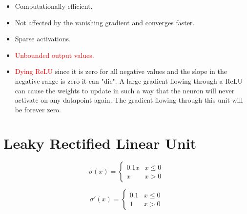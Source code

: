 \documentclass{article}
\begin{document}
\begin{itemize}
  \item Computationally efficient.
  \item Not affected by the vanishing gradient and converges faster.
  \item Sparse activations.
  \item \textcolor{red}{Unbounded output values.}
  \item \textcolor{red}{Dying ReLU}  since it is zero for all negative values and the slope in the negative range is zero it can "die". A large gradient flowing through a ReLU can cause the weights to update in such a way that the neuron will never activate on any datapoint again. The gradient flowing through this unit will be forever zero.
\end{itemize}

\clearpage

\section{Leaky Rectified Linear Unit}

\begin{figure}[!htb]
  \centering
\end{figure}

\begin{equation}
  \sigma(x) =
    \begin{cases}
      0.1x & x \leq 0\\
      x & x > 0
    \end{cases}
\end{equation}
  
\begin{equation}
  \sigma'(x) =
    \begin{cases}
      0.1 & x \leq 0\\
      1 & x > 0
    \end{cases}
\end{equation}
\end{document}
